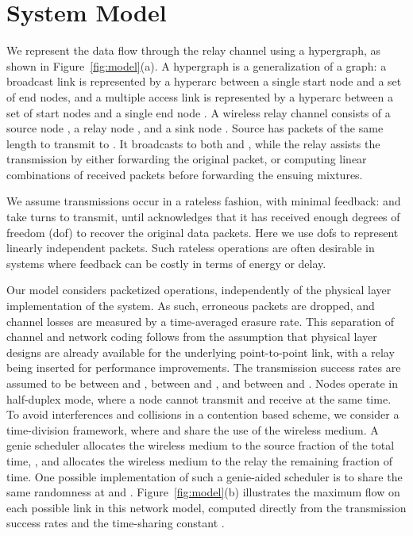 \documentclass[journal, letterpaper]{IEEEtran}
\begin{document}
\section{System Model}\label{sec:systemModel}
We represent the data flow through the relay channel using a hypergraph, as shown in Figure~\ref{fig:model}(a). A hypergraph is a generalization of a graph: a broadcast link is represented by a hyperarc between a single start node and a set of end nodes, and a multiple access link is represented by a hyperarc between a set of start nodes and a single end node \cite{lun2008coding}. A wireless relay channel consists of a source node , a relay node , and a sink node . Source  has  packets of the same length to transmit to . It broadcasts to both  and , while the relay  assists the transmission by either forwarding the original packet, or computing linear combinations of received packets before forwarding the ensuing mixtures.

We assume transmissions occur in a rateless fashion, with minimal feedback:  and  take turns to transmit, until  acknowledges that it has received enough degrees of freedom (dof) to recover the original  data packets. Here we use dofs to represent linearly independent packets. Such rateless operations are often desirable in systems where feedback can be costly in terms of energy or delay.

Our model considers packetized operations, independently of the physical layer implementation of the system. As such, erroneous packets are dropped, and channel losses are measured by a time-averaged erasure rate. This separation of channel and network coding follows from the assumption that physical layer designs are already available for the underlying point-to-point link, with a relay being inserted for performance improvements. The transmission success rates are assumed to be  between  and ,  between  and , and  between  and . Nodes operate in half-duplex mode, where a node cannot transmit and receive at the same time. To avoid interferences and collisions in a contention based scheme, we consider a time-division framework, where  and  share the use of the wireless medium. A genie scheduler allocates the wireless medium to the source  fraction of the total time, , and allocates the wireless medium to the relay the remaining  fraction of time. One possible implementation of such a genie-aided scheduler is to share the same randomness at  and . Figure~\ref{fig:model}(b) illustrates the maximum flow on each possible link in this network model, computed directly from the transmission success rates and the time-sharing constant .
\end{document}
